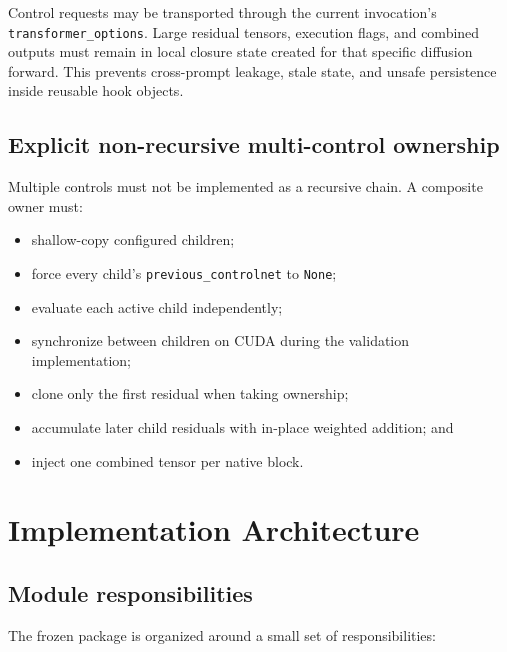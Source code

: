 \documentclass[11pt]{article}
\newcommand{\code}[1]{\texttt{#1}}
\begin{document}
Control requests may be transported through the current invocation's \code{transformer\_options}. Large residual tensors, execution flags, and combined outputs must remain in local closure state created for that specific diffusion forward. This prevents cross-prompt leakage, stale state, and unsafe persistence inside reusable hook objects.

\subsection{Explicit non-recursive multi-control ownership}

Multiple controls must not be implemented as a recursive chain. A composite owner must:

\begin{itemize}
  \item shallow-copy configured children;
  \item force every child's \code{previous\_controlnet} to \code{None};
  \item evaluate each active child independently;
  \item synchronize between children on CUDA during the validation implementation;
  \item clone only the first residual when taking ownership;
  \item accumulate later child residuals with in-place weighted addition; and
  \item inject one combined tensor per native block.
\end{itemize}

\section{Implementation Architecture}

\subsection{Module responsibilities}

The frozen package is organized around a small set of responsibilities:
\end{document}
